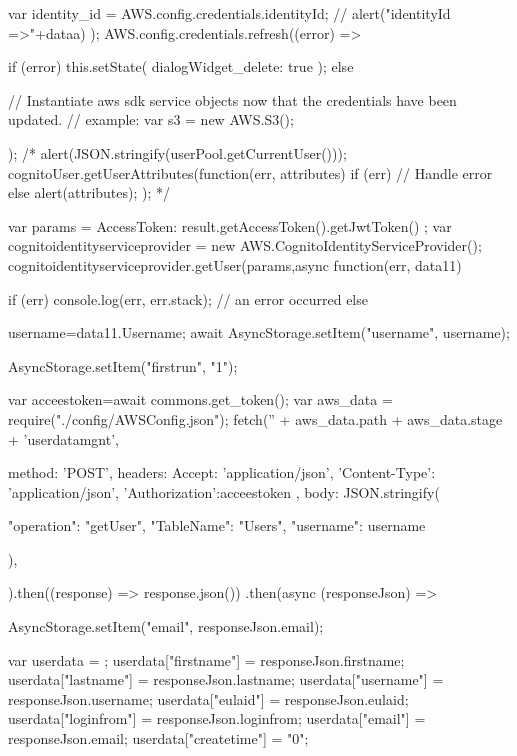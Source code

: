 {{{{{{{          var identity_id = AWS.config.credentials.identityId;
          // alert("identityId =>"+dataa)
        });
        AWS.config.credentials.refresh((error) => {
          if (error) {
            this.setState({ dialogWidget_delete: true });
          } else {
            // Instantiate aws sdk service objects now that the credentials have been updated.
            // example: var s3 = new AWS.S3();

          }
        });
        /*    alert(JSON.stringify(userPool.getCurrentUser()));
            cognitoUser.getUserAttributes(function(err, attributes) {
              if (err) {
                  // Handle error
              } else {
                  alert(attributes);
              }
          }); */

          var params = {
            AccessToken: result.getAccessToken().getJwtToken()
          };
          var cognitoidentityserviceprovider = new AWS.CognitoIdentityServiceProvider();
          cognitoidentityserviceprovider.getUser(params,async function(err, data11) {
            if (err) console.log(err, err.stack); // an error occurred
            else
            {    
                
                username=data11.Username;                
                await AsyncStorage.setItem("username", username);
            
        AsyncStorage.setItem("firstrun", "1");

        var acceestoken=await commons.get_token();
        var aws_data = require("./config/AWSConfig.json");
        fetch('' + aws_data.path + aws_data.stage + 'userdatamgnt', {
          method: 'POST',
          headers: {
            Accept: 'application/json',
            'Content-Type': 'application/json',
            'Authorization':acceestoken
          },
          body: JSON.stringify({

            "operation": "getUser",
            "TableName": "Users",
            "username": username

          }),
        }).then((response) => response.json())
          .then(async (responseJson) => {

            AsyncStorage.setItem("email", responseJson.email);

            var userdata = {};
            userdata["firstname"] = responseJson.firstname;
            userdata["lastname"] = responseJson.lastname;
            userdata["username"] = responseJson.username;
            userdata["eulaid"] = responseJson.eulaid;
            userdata["loginfrom"] = responseJson.loginfrom;
            userdata["email"] = responseJson.email;
            userdata["createtime"] = "0";

}}}}}}}}}
